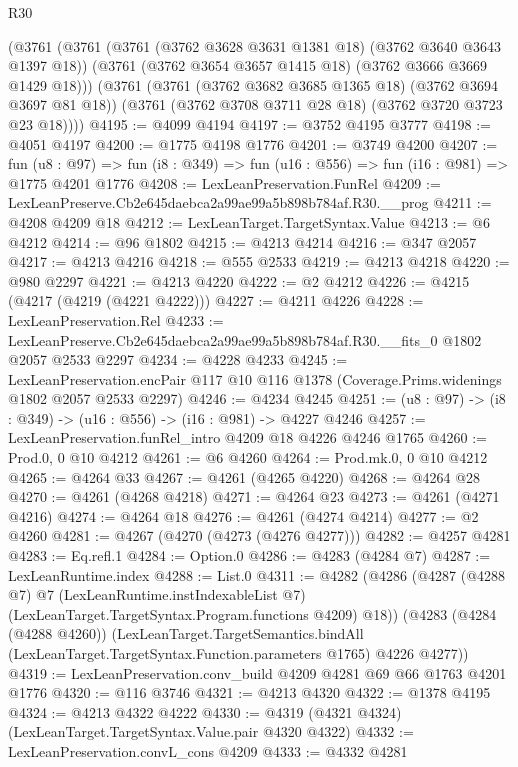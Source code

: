 \begin{lexlean}{R30}
\begin{coremodule}
    (@3761
      (@3761
        (@3761 (@3762 @3628 @3631 @1381 @18) (@3762 @3640 @3643 @1397 @18))
        (@3761 (@3762 @3654 @3657 @1415 @18) (@3762 @3666 @3669 @1429 @18)))
      (@3761
        (@3761 (@3762 @3682 @3685 @1365 @18) (@3762 @3694 @3697 @81 @18))
        (@3761 (@3762 @3708 @3711 @28 @18) (@3762 @3720 @3723 @23 @18))))
@4195 := @4099 @4194
@4197 := @3752 @4195 @3777
@4198 := @4051 @4197
@4200 := @1775 @4198 @1776
@4201 := @3749 @4200
@4207 := fun (u8 : @97) =>
  fun (i8 : @349) => fun (u16 : @556) => fun (i16 : @981) => @1775 @4201 @1776
@4208 := LexLeanPreservation.FunRel
@4209 := LexLeanPreserve.Cb2e645daebca2a99ae99a5b898b784af.R30.__prog
@4211 := @4208 @4209 @18
@4212 := LexLeanTarget.TargetSyntax.Value
@4213 := @6 @4212
@4214 := @96 @1802
@4215 := @4213 @4214
@4216 := @347 @2057
@4217 := @4213 @4216
@4218 := @555 @2533
@4219 := @4213 @4218
@4220 := @980 @2297
@4221 := @4213 @4220
@4222 := @2 @4212
@4226 := @4215 (@4217 (@4219 (@4221 @4222)))
@4227 := @4211 @4226
@4228 := LexLeanPreservation.Rel
@4233 := LexLeanPreserve.Cb2e645daebca2a99ae99a5b898b784af.R30.__fits_0 @1802 @2057 @2533 @2297
@4234 := @4228 @4233
@4245 := LexLeanPreservation.encPair
    @117
    @10
    @116
    @1378
    (Coverage.Prims.widenings @1802 @2057 @2533 @2297)
@4246 := @4234 @4245
@4251 := (u8 : @97) -> (i8 : @349) -> (u16 : @556) -> (i16 : @981) -> @4227 @4246
@4257 := LexLeanPreservation.funRel_intro @4209 @18 @4226 @4246 @1765
@4260 := Prod.{0, 0} @10 @4212
@4261 := @6 @4260
@4264 := Prod.mk.{0, 0} @10 @4212
@4265 := @4264 @33
@4267 := @4261 (@4265 @4220)
@4268 := @4264 @28
@4270 := @4261 (@4268 @4218)
@4271 := @4264 @23
@4273 := @4261 (@4271 @4216)
@4274 := @4264 @18
@4276 := @4261 (@4274 @4214)
@4277 := @2 @4260
@4281 := @4267 (@4270 (@4273 (@4276 @4277)))
@4282 := @4257 @4281
@4283 := Eq.refl.{1}
@4284 := Option.{0}
@4286 := @4283 (@4284 @7)
@4287 := LexLeanRuntime.index
@4288 := List.{0}
@4311 := @4282
    (@4286
      (@4287
        (@4288 @7)
        @7
        (LexLeanRuntime.instIndexableList @7)
        (LexLeanTarget.TargetSyntax.Program.functions @4209)
        @18))
    (@4283
      (@4284 (@4288 @4260))
      (LexLeanTarget.TargetSemantics.bindAll
        (LexLeanTarget.TargetSyntax.Function.parameters @1765)
        @4226
        @4277))
@4319 := LexLeanPreservation.conv_build @4209 @4281 @69 @66 @1763 @4201 @1776
@4320 := @116 @3746
@4321 := @4213 @4320
@4322 := @1378 @4195
@4324 := @4213 @4322 @4222
@4330 := @4319 (@4321 @4324) (LexLeanTarget.TargetSyntax.Value.pair @4320 @4322)
@4332 := LexLeanPreservation.convL_cons @4209
@4333 := @4332 @4281

\end{coremodule}
\end{lexlean}
